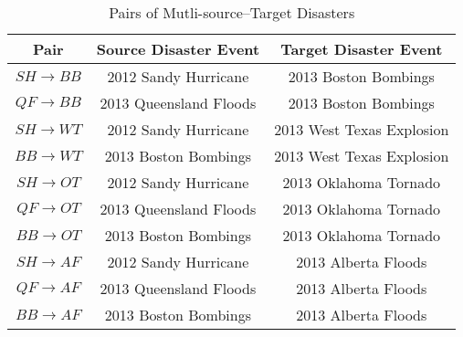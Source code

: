 \begin{table}[ht]
    \begin{center}
    \caption{Pairs of Mutli-source--Target Disasters}
    \begin{tabular}[c]{|c|c|c|}
        \hline
        Pair & Source Disaster Event & Target Disaster Event  \\
        \hline
        $SH \rightarrow BB$ & 2012 Sandy Hurricane & 2013 Boston Bombings \\
        $QF \rightarrow BB$ & 2013 Queensland Floods & 2013 Boston Bombings \\

        $SH \rightarrow WT$ & 2012 Sandy Hurricane & 2013 West Texas Explosion \\
        $BB \rightarrow WT$ & 2013 Boston Bombings & 2013 West Texas Explosion \\

        $SH \rightarrow OT$ & 2012 Sandy Hurricane & 2013 Oklahoma Tornado \\
        $QF \rightarrow OT$ & 2013 Queensland Floods & 2013 Oklahoma Tornado \\
        $BB \rightarrow OT$ & 2013 Boston Bombings & 2013 Oklahoma Tornado  \\

        $SH \rightarrow AF$ & 2012 Sandy Hurricane & 2013 Alberta Floods \\
        $QF \rightarrow AF$ & 2013 Queensland Floods & 2013 Alberta Floods \\
        $BB \rightarrow AF$ & 2013 Boston Bombings & 2013 Alberta Floods \\
        \hline
    \end{tabular}
    \label{pairstablemulti}
   \end{center}
\end{table}


